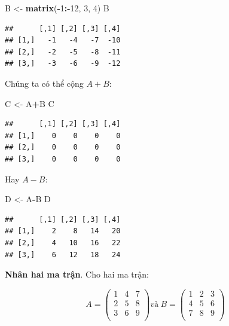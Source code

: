 \documentclass[
]{book}
\newenvironment{Shaded}{\begin{snugshade}}{\end{snugshade}}
\newcommand{\DecValTok}[1]{\textcolor[rgb]{0.00,0.00,0.81}{#1}}
\newcommand{\KeywordTok}[1]{\textcolor[rgb]{0.13,0.29,0.53}{\textbf{#1}}}
\newcommand{\NormalTok}[1]{#1}
\newcommand{\OperatorTok}[1]{\textcolor[rgb]{0.81,0.36,0.00}{\textbf{#1}}}
\newcommand{\StringTok}[1]{\textcolor[rgb]{0.31,0.60,0.02}{#1}}
\begin{document}
\begin{Shaded}
\begin{Highlighting}[]
\NormalTok{B \textless{}{-}}\StringTok{ }\KeywordTok{matrix}\NormalTok{(}\OperatorTok{{-}}\DecValTok{1}\OperatorTok{:{-}}\DecValTok{12}\NormalTok{, }\DecValTok{3}\NormalTok{, }\DecValTok{4}\NormalTok{)}
\NormalTok{B}
\end{Highlighting}
\end{Shaded}

\begin{verbatim}
##      [,1] [,2] [,3] [,4]
## [1,]   -1   -4   -7  -10
## [2,]   -2   -5   -8  -11
## [3,]   -3   -6   -9  -12
\end{verbatim}

Chúng ta có thể cộng \(A+B\):

\begin{Shaded}
\begin{Highlighting}[]
\NormalTok{C \textless{}{-}}\StringTok{ }\NormalTok{A}\OperatorTok{+}\NormalTok{B}
\NormalTok{C}
\end{Highlighting}
\end{Shaded}

\begin{verbatim}
##      [,1] [,2] [,3] [,4]
## [1,]    0    0    0    0
## [2,]    0    0    0    0
## [3,]    0    0    0    0
\end{verbatim}

Hay \(A-B\):

\begin{Shaded}
\begin{Highlighting}[]
\NormalTok{D \textless{}{-}}\StringTok{ }\NormalTok{A}\OperatorTok{{-}}\NormalTok{B}
\NormalTok{D}
\end{Highlighting}
\end{Shaded}

\begin{verbatim}
##      [,1] [,2] [,3] [,4]
## [1,]    2    8   14   20
## [2,]    4   10   16   22
## [3,]    6   12   18   24
\end{verbatim}

\textbf{Nhân hai ma trận}. Cho hai ma trận:

\[A = \begin{pmatrix}
1 & 4 & 7 \\
2 & 5 & 8 \\
3 & 6 & 9 \\
\end{pmatrix} và \ B = \begin{pmatrix}
1 & 2 & 3 \\
4 & 5 & 6 \\
7 & 8 & 9 \\
\end{pmatrix}\]
\end{document}
